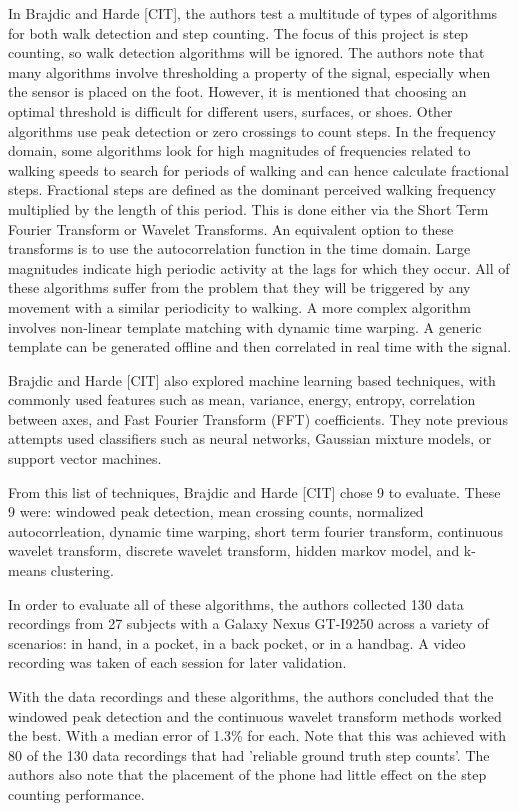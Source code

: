                 In Brajdic and Harde [CIT], the authors test a multitude of types of algorithms for both walk detection and step counting. The focus of this project is step counting, so walk detection algorithms will be ignored. The authors note that many algorithms involve thresholding a property of the signal, especially when the sensor is placed on the foot. However, it is mentioned that choosing an optimal threshold is difficult for different users, surfaces, or shoes. Other algorithms use peak detection or zero crossings to count steps. In the frequency domain, some algorithms look for high magnitudes of frequencies related to walking speeds to search for periods of walking and can hence calculate fractional steps. Fractional steps are defined as the dominant perceived walking frequency multiplied by the length of this period. This is done either via the Short Term Fourier Transform or Wavelet Transforms. An equivalent option to these transforms is to use the autocorrelation function in the time domain. Large magnitudes indicate high periodic activity at the lags for which they occur. All of these algorithms suffer from the problem that they will be triggered by any movement with a similar periodicity to walking. A more complex algorithm involves non-linear template matching with dynamic time warping. A generic template can be generated offline and then correlated in real time with the signal. 

                Brajdic and Harde [CIT] also explored machine learning based techniques, with commonly used features such as mean, variance, energy, entropy, correlation between axes, and Fast Fourier Transform (FFT) coefficients. They note previous attempts used classifiers such as neural networks, Gaussian mixture models, or support vector machines.

                From this list of techniques, Brajdic and Harde [CIT] chose 9 to evaluate. These 9 were: windowed peak detection, mean crossing counts, normalized autocorrleation, dynamic time warping, short term fourier transform, continuous wavelet transform, discrete wavelet transform, hidden markov model, and k-means clustering. 

                In order to evaluate all of these algorithms, the authors collected 130 data recordings from 27 subjects with a Galaxy Nexus GT-I9250 across a variety of scenarios: in hand, in a pocket, in a back pocket, or in a handbag. A video recording was taken of each session for later validation.

                With the data recordings and these algorithms, the authors concluded that the windowed peak detection and the continuous wavelet transform methods worked the best. With a median error of 1.3\% for each. Note that this was achieved with 80 of the 130 data recordings that had 'reliable ground truth step counts'. The authors also note that the placement of the phone had little effect on the step counting performance. 



